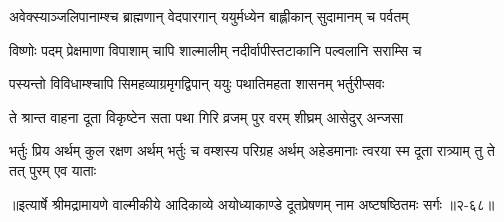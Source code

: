\twolineshloka
{अवेक्स्याञ्जलिपानाम्श्च ब्राह्मणान् वेदपारगान्}
{ययुर्मध्येन बाह्लीकान् सुदामानम् च पर्वतम्} %

\twolineshloka
{विष्णोः पदम् प्रेक्षमाणा विपाशाम् चापि शाल्मालीम्}
{नदीर्वापीस्तटाकानि पल्वलानि सराम्सि च} %

\twolineshloka
{पस्यन्तो विविधाम्श्चापि सिमहव्याग्रमृगद्विपान्}
{ययुः पथातिमहता शासनम् भर्तुरीप्सवः} %

\twolineshloka
{ते श्रान्त वाहना दूता विकृष्टेन सता पथा}
{गिरि व्रजम् पुर वरम् शीघ्रम् आसेदुर् अन्जसा} %

\fourlineindentedshloka
{भर्तुः प्रिय अर्थम् कुल रक्षण अर्थम्}
{भर्तुः च वम्शस्य परिग्रह अर्थम्}
{अहेडमानाः त्वरया स्म दूता}
{रात्र्याम् तु ते तत् पुरम् एव याताः} %


॥इत्यार्षे श्रीमद्रामायणे वाल्मीकीये आदिकाव्ये अयोध्याकाण्डे दूतप्रेषणम् नाम अष्टषष्ठितमः सर्गः ॥२-६८॥
